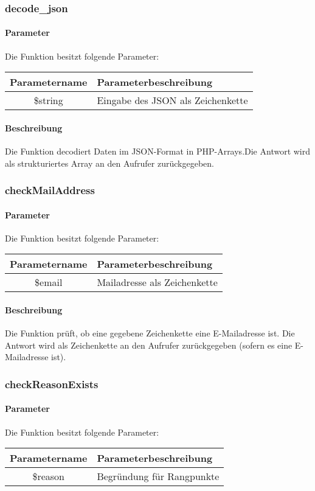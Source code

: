 \subsubsection{decode\_json}
\paragraph{Parameter} Die Funktion besitzt folgende Parameter:
\begin{table}[H]
	\begin{tabular}{|c|p{11cm}|}
		\hline
		\textbf{Parametername} & \textbf{Parameterbeschreibung} \\ \hline
		\$string & Eingabe des JSON als Zeichenkette \\ \hline
	\end{tabular}
\end{table}
\paragraph{Beschreibung} Die Funktion decodiert Daten im JSON-Format in PHP-Arrays.Die Antwort wird als strukturiertes Array an den Aufrufer zurückgegeben.
\subsubsection{checkMailAddress}
\paragraph{Parameter} Die Funktion besitzt folgende Parameter:
\begin{table}[H]
	\begin{tabular}{|c|p{11cm}|}
		\hline
		\textbf{Parametername} & \textbf{Parameterbeschreibung} \\ \hline
		\$email & Mailadresse als Zeichenkette \\ \hline
	\end{tabular}
\end{table}
\paragraph{Beschreibung} Die Funktion prüft, ob eine gegebene Zeichenkette eine E-Mailadresse ist. Die Antwort wird als Zeichenkette an den Aufrufer zurückgegeben (sofern es eine E-Mailadresse ist).
\subsubsection{checkReasonExists}
\paragraph{Parameter} Die Funktion besitzt folgende Parameter:
\begin{table}[H]
	\begin{tabular}{|c|p{11cm}|}
		\hline
		\textbf{Parametername} & \textbf{Parameterbeschreibung} \\ \hline
		\$reason & Begründung für Rangpunkte \\ \hline
	\end{tabular}
\end{table}
